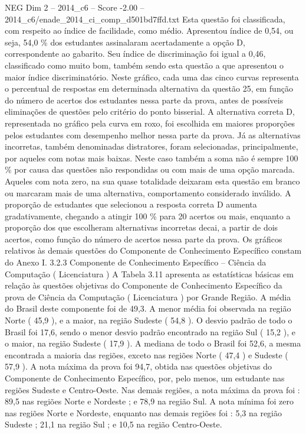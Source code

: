 \begin{textsample}{NEG Dim 2 – 2014\_c6 – Score -2.00 – 2014\_c6/enade\_2014\_ci\_comp\_d501bd7ffd.txt}
Esta questão foi classificada, com respeito ao índice de facilidade, como médio.
Apresentou índice de 0,54, ou seja, 54,0 \% dos estudantes assinalaram acertadamente a opção D, correspondente ao gabarito.
Seu índice de discriminação foi igual a 0,46, classificado como muito bom, também sendo esta questão a que apresentou o maior índice discriminatório.
Neste gráfico, cada uma das cinco curvas representa o percentual de respostas em determinada alternativa da questão 25, em função do número de acertos dos estudantes nessa parte da prova, antes de possíveis eliminações de questões pelo critério do ponto bisserial.
A alternativa correta D, representada no gráfico pela curva em roxo, foi escolhida em maiores proporções pelos estudantes com desempenho melhor nessa parte da prova.
Já as alternativas incorretas, também denominadas distratores, foram selecionadas, principalmente, por aqueles com notas mais baixas.
Neste caso também a soma não é sempre 100 \% por causa das questões não respondidas ou com mais de uma opção marcada.
Aqueles com nota zero, na sua quase totalidade deixaram esta questão em branco ou marcaram mais de uma alternativa, comportamento considerado inválido.
A proporção de estudantes que selecionou a resposta correta D aumenta gradativamente, chegando a atingir 100 \% para 20 acertos ou mais, enquanto a proporção dos que escolheram alternativas incorretas decai, a partir de dois acertos, como função do número de acertos nessa parte da prova.
Os gráficos relativos às demais questões do Componente de Conhecimento Específico constam do Anexo I. 3.2.3 Componente de Conhecimento Específico – Ciência da Computação ( Licenciatura ) A Tabela 3.11 apresenta as estatísticas básicas em relação às questões objetivas do Componente de Conhecimento Específico da prova de Ciência da Computação ( Licenciatura ) por Grande Região.
A média do Brasil deste componente foi de 49,3.
A menor média foi observada na região Norte ( 45,9 ), e a maior, na região Sudeste ( 54,8 ).
O desvio padrão de todo o Brasil foi 17,6, sendo o menor desvio padrão encontrado na região Sul ( 15,2 ), e o maior, na região Sudeste ( 17,9 ).
A mediana de todo o Brasil foi 52,6, a mesma encontrada a maioria das regiões, exceto nas regiões Norte ( 47,4 ) e Sudeste ( 57,9 ).
A nota máxima da prova foi 94,7, obtida nas questões objetivas do Componente de Conhecimento Específico, por, pelo menos, um estudante nas regiões Sudeste e Centro-Oeste.
Nas demais regiões, a nota máxima da prova foi : 89,5 nas regiões Norte e Nordeste ; e 78,9 na região Sul.
A nota mínima foi zero nas regiões Norte e Nordeste, enquanto nas demais regiões foi : 5,3 na região Sudeste ; 21,1 na região Sul ; e 10,5 na região Centro-Oeste.

\end{textsample}
